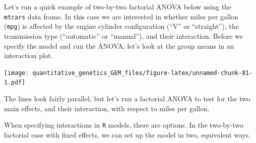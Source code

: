 \documentclass[
]{book}
\newenvironment{Shaded}{\begin{snugshade}}{\end{snugshade}}
\newcommand{\AttributeTok}[1]{\textcolor[rgb]{0.77,0.63,0.00}{#1}}
\newcommand{\DecValTok}[1]{\textcolor[rgb]{0.00,0.00,0.81}{#1}}
\newcommand{\DocumentationTok}[1]{\textcolor[rgb]{0.56,0.35,0.01}{\textbf{\textit{#1}}}}
\newcommand{\FunctionTok}[1]{\textcolor[rgb]{0.00,0.00,0.00}{#1}}
\newcommand{\NormalTok}[1]{#1}
\newcommand{\OtherTok}[1]{\textcolor[rgb]{0.56,0.35,0.01}{#1}}
\newcommand{\SpecialCharTok}[1]{\textcolor[rgb]{0.00,0.00,0.00}{#1}}
\newcommand{\StringTok}[1]{\textcolor[rgb]{0.31,0.60,0.02}{#1}}
\begin{document}
Let's run a quick example of two-by-two factorial ANOVA below using the \texttt{mtcars} data frame. In this case we are interested in whether miles per gallon (\texttt{mpg}) is affected by the engine cylinder configuration (``V'' or ``straight''), the transmission type (``automatic'' or ``manual''), and their interaction. Before we specify the model and run the ANOVA, let's look at the group means in an interaction plot.

\begin{Shaded}
\end{Shaded}

\texttt{[image: quantitative\_genetics\_GEM\_files/figure-latex/unnamed-chunk-81-1.pdf]}

The lines look fairly parallel, but let's run a factorial ANOVA to test for the two main effects, and their interaction, with respect to miles per gallon.

When specifying interactions in \texttt{R} models, there are options. In the two-by-two factorial case with fixed effects, we can set up the model in two, equivalent ways.
\end{document}
